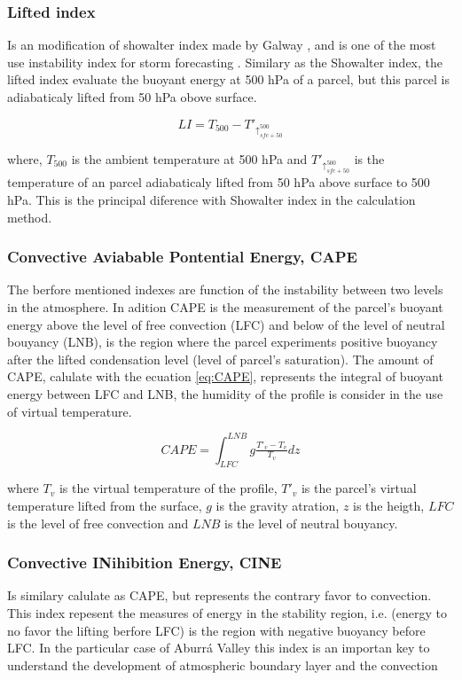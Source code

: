 \documentclass{ametsoc}
\begin{document}
\subsubsection{Lifted index}

Is an modification of showalter index made by Galway \cite{galway1956lifted}, and is one of the most use instability index for storm forecasting \cite{peppler1988review}. Similary as the Showalter index, the lifted index evaluate the buoyant energy at 500 hPa of a parcel, but this parcel is adiabaticaly lifted from 50 hPa obove surface. 

\begin{equation}
LI = T_{500} - T'_{\uparrow_{sfc +50}^{500} }
\label{eq:LI}
\end{equation}

where, $T_{500}$ is the ambient temperature at 500 hPa and $T'_{\uparrow_{sfc +50}^{500} }$ is the temperature of an parcel adiabaticaly lifted from 50 hPa above surface to 500 hPa. This is the principal diference with Showalter index in the calculation method.\\


\subsubsection{Convective Aviabable Pontential Energy, CAPE}
The berfore mentioned indexes are function of the instability between two levels in the atmosphere. In adition CAPE is the measurement of the parcel's buoyant energy above the level of free convection (LFC) and below of the level of neutral bouyancy (LNB), is the region where the parcel experiments positive buoyancy after the lifted condensation level (level of parcel's saturation). The amount of CAPE, calulate with the ecuation \ref{eq:CAPE}, represents the integral of buoyant energy between LFC and LNB, the humidity of the profile is consider in the use of virtual temperature. 

\begin{equation}
CAPE = \int_{LFC}^{LNB}g\tfrac{T'_v-T_v}{T_v}dz
\label{eq:CAPE}
\end{equation}

where  $T_v$ is the virtual temperature of the profile, $T'_v$ is the parcel's virtual temperature lifted from the surface, $g$ is the gravity atration, $z$ is the heigth, $LFC$ is the level of free convection and $LNB$ is the level of neutral bouyancy.

\subsubsection{Convective INihibition Energy, CINE}
Is similary calulate as CAPE, but represents the contrary favor to convection. This index repesent the measures of energy in the stability region, i.e. (energy to no favor the lifting berfore LFC) is the region with negative buoyancy before LFC. In the particular case of Aburrá Valley this index is an importan key to understand the development of atmospheric boundary layer and the convection 
\end{document}
